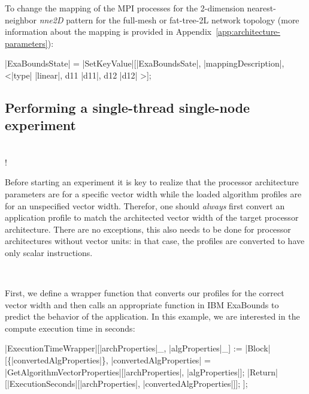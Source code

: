 To change the mapping of the MPI processes for the 2-dimension nearest-neighbor \textit{nne2D} pattern for the full-mesh or fat-tree-2L network topology (more information about the mapping is provided in Appendix~\ref{app:architecture-parameters}):
\begin{mma}
	\In |ExaBoundsState| = |SetKeyValue|[|ExaBoundsSate|, |mappingDescription|, \linebreak <|type| \rightarrow  {}|linear|,  d11 \rightarrow |d11|, d12 \rightarrow |d12| \mathtt{\mid}>]; \\
\end{mma}

\subsection{Performing a single-thread single-node experiment}

\begin{minipage}[t]{0.05\textwidth}
~\\
\Huge !
\end{minipage}
\begin{minipage}[t]{0.94\textwidth}
Before starting an experiment it is key to realize that the processor architecture parameters are for a specific vector width while the loaded algorithm profiles are for an unspecified vector width. Therefor, one should \emph{always} first convert an application profile to match the architected vector width of the target processor architecture. There are no exceptions, this also needs to be done for processor architectures without vector units: in that case, the profiles are converted to have only scalar instructions.
\end{minipage}
~\linebreak

First, we define a wrapper function that converts our profiles for the correct vector width and then calls an appropriate function in IBM ExaBounds to predict the behavior of the application. In this example, we are interested in the compute execution time in seconds:
\begin{mma}
  \In |ExecutionTimeWrapper|[|archProperties|\_, |algProperties|\_] := \linebreak
  |Block|[\{|convertedAlgProperties|\}, \linebreak
  \quad|convertedAlgProperties| = \linebreak
  \quad\quad|GetAlgorithmVectorProperties|[|archProperties|, \linebreak \quad\quad\quad |algProperties|]; \linebreak
  \quad|Return|[\linebreak\quad\quad|ExecutionSeconds|[|archProperties|, |convertedAlgProperties|]\linebreak\quad]; \linebreak
  ]; \\
\end{mma}

